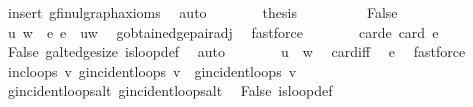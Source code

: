 \begin{isabellebody}
\ insert\ g{\isachardot}{\kern0pt}fin{\isacharunderscore}{\kern0pt}ulgraph{\isacharunderscore}{\kern0pt}axioms\ \isamarkupfalse%
\ auto\isanewline
\ \ \ \ \isamarkupfalse%
\ \isamarkupfalse%
\ {\isacharquery}{\kern0pt}thesis\ \isacommand{{\isachardot}{\kern0pt}}\isamarkupfalse%
\isanewline
\ \ \isamarkupfalse%
\isanewline
\ \ \ \ \isamarkupfalse%
\ False\isanewline
\ \ \ \ \isamarkupfalse%
\ u\ w\ \ e{\isacharcolon}{\kern0pt}\ {\isachardoublequoteopen}e\ {\isacharequal}{\kern0pt}\ {\isacharbraceleft}{\kern0pt}u{\isacharcomma}{\kern0pt}w{\isacharbraceright}{\kern0pt}{\isachardoublequoteclose}\ \isamarkupfalse%
\ g{\isacharprime}{\kern0pt}{\isachardot}{\kern0pt}obtain{\isacharunderscore}{\kern0pt}edge{\isacharunderscore}{\kern0pt}pair{\isacharunderscore}{\kern0pt}adj\ \isamarkupfalse%
\ fastforce\isanewline
\ \ \ \ \isamarkupfalse%
\ \isamarkupfalse%
\ card{\isacharunderscore}{\kern0pt}e{\isacharcolon}{\kern0pt}\ {\isachardoublequoteopen}card\ e\ {\isacharequal}{\kern0pt}\ {}{\isachardoublequoteclose}\ \isamarkupfalse%
\ False\ g{\isacharprime}{\kern0pt}{\isachardot}{\kern0pt}alt{\isacharunderscore}{\kern0pt}edge{\isacharunderscore}{\kern0pt}size\ is{\isacharunderscore}{\kern0pt}loop{\isacharunderscore}{\kern0pt}def\ \isamarkupfalse%
\ auto\isanewline
\ \ \ \ \isamarkupfalse%
\ \isamarkupfalse%
\ {\isachardoublequoteopen}u\ {\isasymnoteq}\ w{\isachardoublequoteclose}\ \isamarkupfalse%
\ card{\isacharunderscore}{\kern0pt}{}{\isacharunderscore}{\kern0pt}iff\ \isamarkupfalse%
\ e\ \isamarkupfalse%
\ fastforce\isanewline
\ \ \ \ \isamarkupfalse%
\ inc{\isacharunderscore}{\kern0pt}loops{\isacharcolon}{\kern0pt}\ {\isachardoublequoteopen}{\isasymAnd}v{\isachardot}{\kern0pt}\ g{\isacharprime}{\kern0pt}{\isachardot}{\kern0pt}incident{\isacharunderscore}{\kern0pt}loops\ v\ {\isacharequal}{\kern0pt}\ g{\isachardot}{\kern0pt}incident{\isacharunderscore}{\kern0pt}loops\ v{\isachardoublequoteclose}\isanewline
\ \ \ \ \ \ \isamarkupfalse%
\ g{\isacharprime}{\kern0pt}{\isachardot}{\kern0pt}incident{\isacharunderscore}{\kern0pt}loops{\isacharunderscore}{\kern0pt}alt\ g{\isachardot}{\kern0pt}incident{\isacharunderscore}{\kern0pt}loops{\isacharunderscore}{\kern0pt}alt\ \isamarkupfalse%
\ False\ is{\isacharunderscore}{\kern0pt}loop{\isacharunderscore}{\kern0pt}def\ \isamarkupfalse%

\end{isabellebody}
